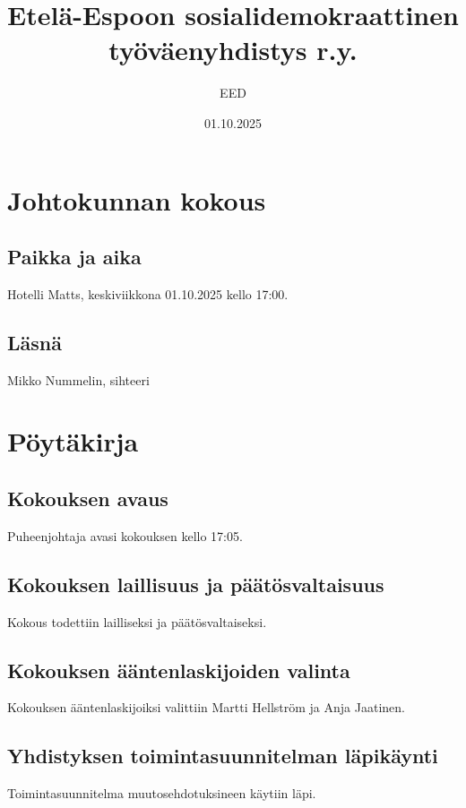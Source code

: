 \documentclass[a4paper,12pt]{article}
\title{Etelä-Espoon sosialidemokraattinen työväenyhdistys r.y.}
\author{EED}
\date{01.10.2025}
\begin{document}
\maketitle
\tableofcontents
\section*{Johtokunnan kokous}
\subsection*{Paikka ja aika}
Hotelli Matts, keskiviikkona 01.10.2025 kello 17:00.
\subsection*{Läsnä}
Mikko Nummelin, sihteeri
\section*{Pöytäkirja}
\subsection{Kokouksen avaus}
Puheenjohtaja avasi kokouksen kello 17:05.
\subsection{Kokouksen laillisuus ja päätösvaltaisuus}
Kokous todettiin lailliseksi ja päätösvaltaiseksi.
\subsection{Kokouksen ääntenlaskijoiden valinta}
Kokouksen ääntenlaskijoiksi valittiin Martti Hellström ja Anja Jaatinen.
\subsection{Yhdistyksen toimintasuunnitelman läpikäynti}
Toimintasuunnitelma muutosehdotuksineen käytiin läpi.
\end{document}

